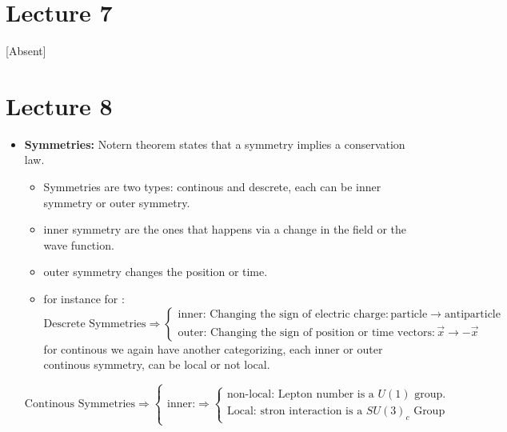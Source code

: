 \documentclass[10pt,a4paper]{article}
\newcounter{theo}
\begin{document}
     \section{Lecture 7}
     [Absent]
     \section{Lecture 8}
          \begin{itemize}
               \item \textbf{Symmetries:} Notern theorem states that a symmetry implies a conservation law. 
               \begin{itemize}
                    \item Symmetries are two types: continous and descrete, each can be inner symmetry or outer symmetry.
                    \item inner symmetry are the ones that happens via a change in the field or the wave function.
                    \item outer  symmetry changes the position or time.
                    \item for instance for :
                    \begin{equation}
                         \text{Descrete Symmetries}\Rightarrow\left\{
                              \begin{matrix}
                                   \text{inner: Changing the sign of electric charge}: \text{particle} \rightarrow \text{antiparticle}\\
                                   \text{outer: Changing the sign of position or time vectors}: \vec x \rightarrow -\vec x
                              \end{matrix}\right.
                    \end{equation}
                    for continous we again have another categorizing, each inner or outer continous symmetry, can be local or not local.
               \end{itemize}
               \begin{equation}
                    \text{Continous Symmetries}\Rightarrow\left\{
                         \begin{matrix}
                              \text{inner:}\Rightarrow \left\{
                                   \begin{matrix}
                                        \text{non-local: Lepton number is a } U(1) \text{ group}.\\
                                        \text{Local: stron interaction is a } SU(3)_c \text{ Group}

\end{matrix}
\end{matrix}
\end{equation}
\end{itemize}
\end{document}
